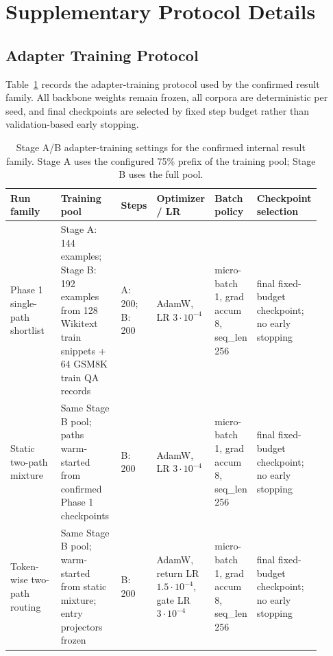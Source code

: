 \section{Supplementary Protocol Details}

\subsection{Adapter Training Protocol}
\label{sec:adapter-training-appendix}

Table~\ref{tab:adapter-training} records the adapter-training protocol used by the confirmed result family. All backbone weights remain frozen, all corpora are deterministic per seed, and final checkpoints are selected by fixed step budget rather than validation-based early stopping.

\begin{table}[h]
\centering
\caption{Stage A/B adapter-training settings for the confirmed internal result family. Stage A uses the configured 75\% prefix of the training pool; Stage B uses the full pool.}
\label{tab:adapter-training}
\small
\begin{tabular}{>{\raggedright\arraybackslash}p{0.18\linewidth} >{\raggedright\arraybackslash}p{0.20\linewidth} >{\centering\arraybackslash}p{0.10\linewidth} >{\centering\arraybackslash}p{0.11\linewidth} >{\centering\arraybackslash}p{0.11\linewidth} >{\raggedright\arraybackslash}p{0.20\linewidth}}
\toprule
Run family & Training pool & Steps & Optimizer / LR & Batch policy & Checkpoint selection \\
\midrule
Phase 1 single-path shortlist & Stage A: 144 examples; Stage B: 192 examples from 128 Wikitext train snippets + 64 GSM8K train QA records & A: 200; B: 200 & AdamW, LR $3\cdot10^{-4}$ & micro-batch 1, grad accum 8, seq_len 256 & final fixed-budget checkpoint; no early stopping \\
Static two-path mixture & Same Stage B pool; paths warm-started from confirmed Phase 1 checkpoints & B: 200 & AdamW, LR $3\cdot10^{-4}$ & micro-batch 1, grad accum 8, seq_len 256 & final fixed-budget checkpoint; no early stopping \\
Token-wise two-path routing & Same Stage B pool; warm-started from static mixture; entry projectors frozen & B: 200 & AdamW, return LR $1.5\cdot10^{-4}$, gate LR $3\cdot10^{-4}$ & micro-batch 1, grad accum 8, seq_len 256 & final fixed-budget checkpoint; no early stopping \\
\bottomrule
\end{tabular}
\end{table}

